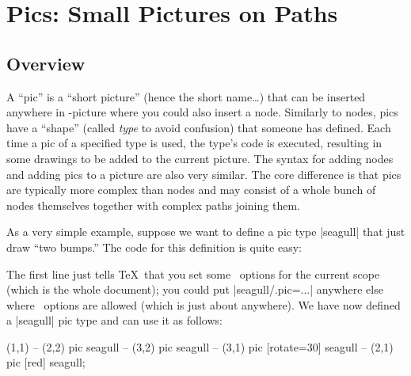 %
%
%

\section{Pics: Small Pictures on Paths}

\label{section-pics}

\subsection{Overview}

A ``pic'' is a ``short picture'' (hence the short name\dots) that can
be inserted anywhere in \tikzname-picture where you could also insert
a node. Similarly to nodes, pics have a ``shape'' (called \emph{type}
to avoid confusion) that someone has defined. Each time a pic of a
specified type is used, the type's code is executed, resulting in some
drawings to be added to the current picture. The syntax for adding
nodes and adding pics to a picture are also very similar. The core
difference is that pics are typically more complex than nodes and may
consist of a whole bunch of nodes themselves together with complex
paths joining them.

As a very simple example, suppose we want to define a pic type
|seagull| that just draw ``two bumps.'' The code for this definition
is quite easy:
\begin{codeexample}
\end{codeexample}

The first line just tells \TeX\ that you set some \tikzname\ options
for the current scope (which is the whole document); you could put
|seagull/.pic=...| anywhere else where \tikzname\ options are allowed
(which is just about anywhere). We have now defined a |seagull| pic
type and can use it as follows:

\begin{codeexample}[]
\tikz \fill [fill=blue!20]
     (1,1)
  -- (2,2) pic             {seagull}
  -- (3,2) pic             {seagull}
  -- (3,1) pic [rotate=30] {seagull}
  -- (2,1) pic [red]       {seagull};
\end{codeexample}

